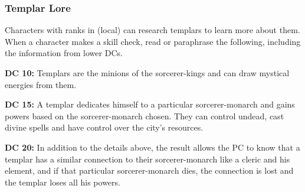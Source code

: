 \subsubsection{Templar Lore}
Characters with ranks in  (local) can research templars to learn more about them. When a character makes a skill check, read or paraphrase the following, including the information from lower DCs.

\textbf{DC 10:} Templars are the minions of the sorcerer-kings and can draw mystical energies from them.

\textbf{DC 15:} A templar dedicates himself to a particular sorcerer-monarch and gains powers based on the sorcerer-monarch chosen. They can control undead, cast divine spells and have control over the city's resources.

\textbf{DC 20:} In addition to the details above, the result allows the PC to know that a templar has a similar connection to their sorcerer-monarch like a cleric and his element, and if that particular sorcerer-monarch dies, the connection is lost and the templar loses all his powers.